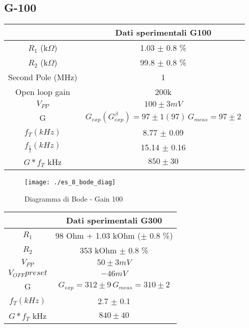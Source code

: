 \documentclass{beamer}
\begin{document}
\subsection{G-100}

\begin{frame}

{
\centering
\begin{tabular}{|c|c|}
\hline  &  \textbf{Dati sperimentali G100} \\ 
\hline $R_1$ (k$\Omega$) &  1.03 $\pm$ 0.8 \% \\ 
\hline $R_2$ (k$\Omega$) & 99.8 $\pm$ 0.8 \%  \\ 
\hline Second Pole (MHz) & 1   \\ 
\hline Open loop gain & 200k    \\ 
\hline $V_{PP}$ & $100  \pm 3 \si{mV} $ \\ 
\hline G &  $G_{exp}(G_{exp}^{\beta})  = 97 \pm 1 (97) \, G_{meas} = 97 \pm 2 $ \\ 
\hline $f_T (kHz)$ &  8.77 $\pm$ 0.09 \\
\hline $f_{\frac{1}{2}} (kHz)$ &  15.14 $\pm$ 0.16 \\
\hline $G*f_{T}$ \si{kHz} & $ 850 \pm 30 $\\
\hline
\end{tabular} 

}
\end{frame}

\begin{frame}
\begin{figure}
\centering
\texttt{[image: ./es\_8\_bode\_diag]}
\caption{Diagramma di Bode - Gain 100}
\label{fig:es_8_bode_diag}
\end{figure}

\end{frame}

\begin{frame}

{
\centering
\begin{tabular}{|c|c|}
\hline  &  \textbf{Dati sperimentali G300} \\ 
\hline $R_1$  &  98 \si{Ohm} + 1.03 \si{kOhm} ($\pm$ 0.8 \%) \\ 
\hline $R_2$ & 353 \si{kOhm} $\pm$ 0.8 \%  \\ 
\hline $V_{PP}$ & $50  \pm 3 \si{mV} $ \\ 
\hline $V_{OFF} preset$ & $ -46  \si{mV} $ \\
\hline G &  $G_{exp}  = 312 \pm 9  \, G_{meas} = 310 \pm 2 $ \\ 
\hline $f_T (kHz)$ &  2.7 $\pm$ 0.1 \\
\hline $G*f_{T}$ \si{kHz} & $ 840 \pm 40 $\\
\hline
\end{tabular}
 
}

\end{frame}
\end{document}
